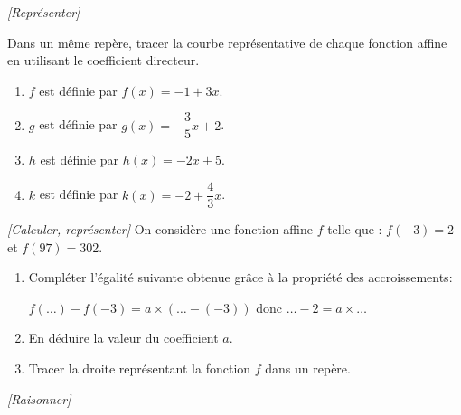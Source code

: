 \exo \textit{[Représenter]}

Dans un même repère, tracer la courbe représentative de chaque fonction affine en utilisant le coefficient directeur.

\begin{enumerate}[label=\alph*)]
\item  $f$ est définie par $f(x)=-1+3x$.
\item  $g$ est définie par $g(x)=-\dfrac{3}{5}x+2$.
\item  $h$ est définie par $h(x)=-2x+5$.
\item  $k$ est définie par $k(x)=-2+\dfrac{4}{3}x$.
\end{enumerate}

\exo \textit{[Calculer, représenter]}
On considère une fonction affine $f$ telle que : $f(-3)=2$ et $f(97)=302$.

\begin{enumerate}
\item Compléter l'égalité suivante obtenue grâce à la propriété des accroissements:

$f(\ldots)-f(-3)= a \times (\ldots -(-3))$ donc $\ldots - 2 = a \times \ldots$
\item En déduire la valeur du coefficient $a$.
\item Tracer la droite représentant la fonction $f$ dans un repère.
\end{enumerate}


\exo \textit{[Raisonner]}
\smallskip

